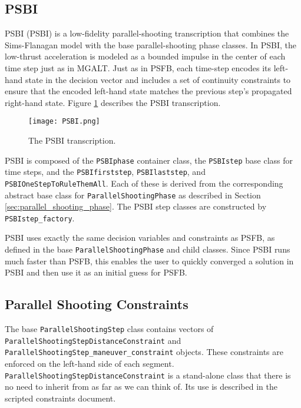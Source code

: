\subsection{PSBI}
\label{subsec:PSBI}

\acl{PSBI} (\acs{PSBI}) is a low-fidelity parallel-shooting transcription that combines the Sims-Flanagan model \cite{SimsFlanagan1999} with the base parallel-shooting phase classes. In \ac{PSBI}, the low-thrust acceleration is modeled as a bounded impulse in the center of each time step just as in \ac{MGALT}. Just as in \ac{PSFB}, each time-step encodes its left-hand state in the decision vector and includes a set of continuity constraints to ensure that the encoded left-hand state matches the previous step's propagated right-hand state. Figure \ref{fig:PSBI_diagram} describes the \ac{PSBI} transcription.

\begin{figure}[hb]
	\centering
	\texttt{[image: PSBI.png]}
	\caption{ The \ac{PSBI} transcription.}
	\label{fig:PSBI_diagram}
\end{figure}

\ac{PSBI} is composed of the \texttt{PSBIphase} container class, the \texttt{PSBIstep} base class for time steps, and the \texttt{PSBIfirststep}, \texttt{PSBIlaststep}, and \texttt{PSBIOneStepToRuleThemAll}. Each of these is derived from the corresponding abstract base class for \texttt{ParallelShootingPhase} as described in Section \ref{sec:parallel_shooting_phase}. The \ac{PSBI} step classes are constructed by \texttt{PSBIstep\_factory}.

\ac{PSBI} uses exactly the same decision variables and constraints as \ac{PSFB}, as defined in the base \texttt{ParallelShootingPhase} and child classes. Since \ac{PSBI} runs much faster than \ac{PSFB}, this enables the user to quickly converged a solution in \ac{PSBI} and then use it as an initial guess for \ac{PSFB}.

\subsection{Parallel Shooting Constraints}
\label{subsec:parallel_shooting_constraints}

The base \texttt{ParallelShootingStep} class contains vectors of \texttt{ParallelShootingStepDistanceConstraint} and \texttt{ParallelShootingStep\_maneuver\_constraint} objects. These constraints are enforced on the left-hand side of each segment. \texttt{ParallelShootingStepDistanceConstraint} is a stand-alone class that there is no need to inherit from as far as we can think of. Its use is described in the scripted constraints document.

